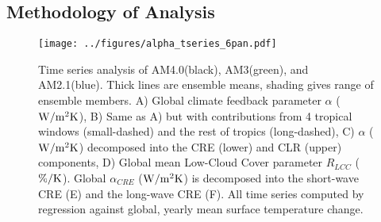 \subsection{Methodology of Analysis}        

\begin{figure}
   \texttt{[image: ../figures/alpha\_tseries\_6pan.pdf]}
  \caption{Time series analysis of AM4.0(black), AM3(green), and AM2.1(blue).  Thick lines are ensemble means, shading gives range of ensemble members.  A) Global climate feedback parameter $\alpha$ ($\rm{W/m^2 K}$),  
  B) Same as  A) but with contributions from 4 tropical windows (small-dashed) and the rest of tropics (long-dashed),  C)  $\alpha$ ($\rm{W/m^2 K}$) decomposed into the CRE (lower) and CLR (upper) components,   D)  Global mean Low-Cloud Cover parameter $R_{LCC}$ ($\rm{\% /K}$).  Global $\alpha_{CRE}$ ($\rm{W/m^2 K}$) is decomposed into the short-wave CRE (E) and the long-wave CRE (F).   All time series computed by regression against global, yearly mean surface temperature change.}
  \label{fig:alphacre}
\end{figure}

